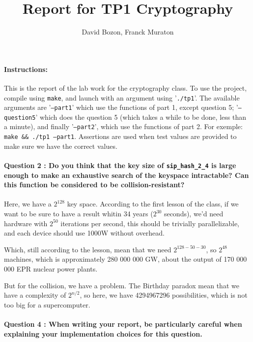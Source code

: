 \documentclass[4apaper]{report}
\author{David Bozon, Franck Muraton}
\begin{document}
\title{Report for TP1 Cryptography}
\maketitle

\paragraph{Instructions: \\} This is the report of the lab work for the cryptography class. To use the project, compile using \texttt{make}, and launch with an argument using '\texttt{./tp1}'. The available arguments are '\texttt{--part1}' which use the functions of part 1, except question 5; '\texttt{--question5}' which does the question 5 (which takes a while to be done, less than a minute), and finally '\texttt{--part2}', which use the functions of part 2. For exemple: \texttt{make \&\& ./tp1 --part1}. Assertions are used when test values are provided to make sure we have the correct values.

\paragraph{Question 2 : Do you think that the key size of \texttt{sip\_hash\_2\_4} is large enough to make an exhaustive search of the keyspace intractable? Can this function be considered to be collision-resistant?}

\paragraph{}Here, we have a $2^{128}$ key space. According to the first lesson of the class, if we want to be sure to have a result whitin 34 years ($2^{30}$ seconds), we'd need hardware with $2^{50}$ iterations per second, this should be trivially parallelizable, and each device should use 1000W without overhead.

Which, still according to the lesson, mean that we need $2^{128-50-30}$, so $2^{48}$ machines, which is approximately 280 000 000 GW, about the output of 170 000 000 EPR nuclear power plants.

But for the collision, we have a problem. The Birthday paradox mean that we have a complexity of $2^{n/2}$, so here, we have 4294967296 possibilities, which is not too big for a supercomputer.

\paragraph{Question 4 : When writing your report, be particularly careful when explaining your implementation
choices for this question.}
\end{document}
